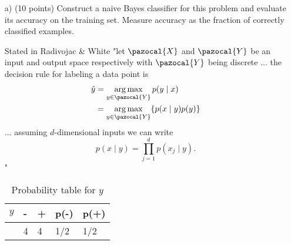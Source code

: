 \documentclass[a4 paper]{article}
\DeclareMathOperator*{\argmax}{arg\,max}
\begin{document}
	\begin{enumerate}
	\item[a)] (10 points) Construct a naive Bayes classifier for this problem and evaluate its accuracy on the training set. Measure accuracy as the fraction of correctly classified examples.
	
	Stated in Radivojac \& White "let $\pazocal{X}$ and $\pazocal{Y}$ be an input and output space respectively with $\pazocal{Y}$ being discrete ... the decision rule for labeling a data point is
	\begin{equation*}
	\begin{split}
	\hat{y}  & = \argmax_{y\in\pazocal{Y}} p(y \mid x) \\
	& = \argmax_{y\in\pazocal{Y}}\{p(x\mid y)p(y)\}
	\end{split}
	\end{equation*}
	...
	assuming $d$-dimensional inputs we can write 
	\begin{equation*}
	p(x \mid y) = \prod^d_{j=1}p(x_j \mid y).
	\end{equation*}
	"
\begin{table}[!htb]
        \begin{minipage}{1\linewidth}
      \centering
      \caption{Probability table for $y$}
 		\begin{tabular}{|l||l|l|l|l|} \hline 
			$y$  & - & + & p(-) & p(+) \\ \hline \hline
				 &  4 &  4 &  1/2   &   1/2   \\ \hline
		\end{tabular}
    \end{minipage}
   

\end{table}
\end{enumerate}
\end{document}
